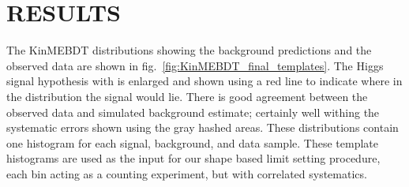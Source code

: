 %
%
%


\chapter{\texorpdfstring{\uppercase {Results}}{Results}}
\label{ch:results}

The KinMEBDT distributions showing the background predictions and the observed data are shown in fig.~\ref{fig:KinMEBDT_final_templates}.
The Higgs signal hypothesis with \joinsym{\MH}{=}{125\gev} is enlarged and shown using a red line to indicate where in the distribution the signal would lie.
There is good agreement between the observed data and simulated background estimate; certainly well withing the systematic errors shown using the gray hashed areas.
These distributions contain one histogram for each signal, background, and data sample.
These template histograms are used as the input for our shape based limit setting procedure, each bin acting as a counting experiment, but with correlated systematics.

